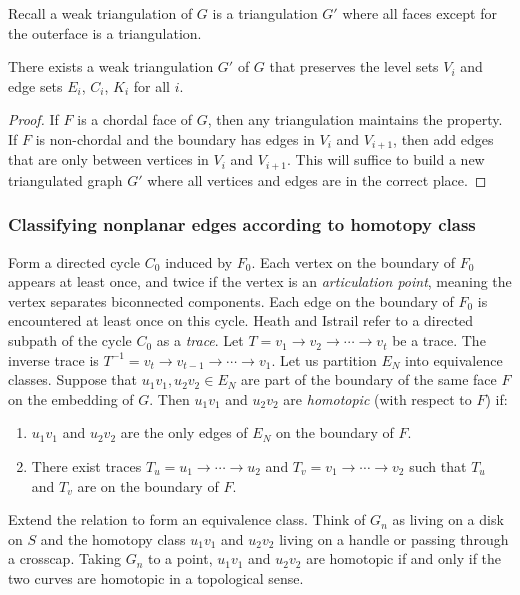Recall a weak triangulation of \(G\) is a triangulation \(G'\) where all faces except for the outerface is a triangulation.
\begin{claim}
	There exists a weak triangulation $G'$ of \(G\) that preserves the level sets \(V_i\) and edge sets \(E_i\), \(C_i\), \(K_i\) for all \(i\).
\end{claim}

\begin{proof}
	If \(F\) is a chordal face of \(G\), then any triangulation maintains the property. If \(F\) is non-chordal and the boundary has edges in \(V_i\) and \(V_{i + 1}\), then add edges that are only between vertices in \(V_i\) and \(V_{i + 1}\). This will suffice to build a new triangulated graph \(G'\) where all vertices and edges are in the correct place.
\end{proof}

\subsubsection{Classifying nonplanar edges according to homotopy class}

Form a directed cycle \(C_0\) induced by \(F_0\). Each vertex on the boundary of \(F_0\) appears at least once, and twice if the vertex is an \textit{articulation point}, meaning the vertex separates biconnected components. Each edge on the boundary of \(F_0\) is encountered at least once on this cycle. Heath and Istrail refer to a directed subpath of the cycle \(C_0\) as a \textit{trace}. Let \(T = v_1 \rightarrow v_2 \rightarrow \cdots \rightarrow v_t\) be a trace. The inverse trace is \(T^{-1} = v_t \rightarrow v_{t-1} \rightarrow \cdots \rightarrow v_1\). Let us partition \(E_N\) into equivalence classes. Suppose that \(u_1v_1, u_2v_2 \in E_N\) are part of the boundary of the same face \(F\) on the embedding of \(G\). Then \(u_1v_1\) and \(u_2v_2\) are \textit{homotopic} (with respect to \(F\)) if:
\begin{enumerate}
	\item \(u_1v_1\) and \(u_2v_2\) are the only edges of \(E_N\) on the boundary of \(F\).
	\item There exist traces \(T_u = u_1 \rightarrow \cdots \rightarrow u_2\) and \(T_v = v_1 \rightarrow \cdots \rightarrow v_2\) such that \(T_u\) and \(T_v\) are on the boundary of \(F\).
\end{enumerate}
Extend the relation to form an equivalence class. 
Think of \(G_n\) as living on a disk on \(S\) and the homotopy class \(u_1v_1\) and \(u_2 v_2\) living on a handle or passing through a crosscap. Taking \(G_n\) to a point, \(u_1v_1\) and \(u_2v_2\) are homotopic if and only if the two curves are homotopic in a topological sense. 

